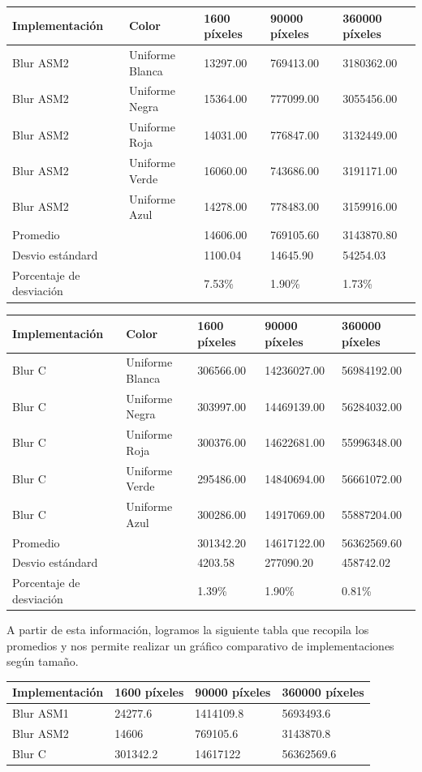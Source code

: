 \begin{tabular}{| l | l | l | l | l |}
\hline
Implementación & Color & 1600 píxeles & 90000 píxeles & 360000 píxeles\\
\hline
Blur ASM2 & Uniforme Blanca & 13297.00 & 769413.00 & 3180362.00\\ 
\hline
Blur ASM2 & Uniforme Negra & 15364.00 & 777099.00 & 3055456.00\\ 
\hline
Blur ASM2 & Uniforme Roja & 14031.00 & 776847.00 & 3132449.00\\ 
\hline
Blur ASM2 & Uniforme Verde & 16060.00 & 743686.00 & 3191171.00\\
\hline
Blur ASM2 & Uniforme Azul & 14278.00 & 778483.00 & 3159916.00\\
\hline
Promedio & &   14606.00 & 769105.60 & 3143870.80\\
\hline
Desvio estándard  &&  1100.04 & 14645.90 & 54254.03\\
\hline
Porcentaje de desviación  &&   7.53\% & 1.90\% & 1.73\%\\
\hline
\end{tabular}

\begin{tabular}{| l | l | l | l | l |}
\hline
Implementación & Color & 1600 píxeles & 90000 píxeles & 360000 píxeles\\
\hline
Blur C & Uniforme Blanca & 306566.00 & 14236027.00 & 56984192.00\\ 
\hline
Blur C & Uniforme Negra & 303997.00 & 14469139.00 & 56284032.00\\ 
\hline
Blur C & Uniforme Roja & 300376.00 & 14622681.00 & 55996348.00\\ 
\hline
Blur C & Uniforme Verde & 295486.00 & 14840694.00 & 56661072.00\\
\hline
Blur C & Uniforme Azul & 300286.00 & 14917069.00 & 55887204.00\\
\hline
Promedio & &   301342.20 & 14617122.00 & 56362569.60\\
\hline
Desvio estándard  &&  4203.58 & 277090.20 & 458742.02\\
\hline
Porcentaje de desviación  &&   1.39\% & 1.90\% & 0.81\%\\
\hline
\end{tabular}

A partir de esta información, logramos la siguiente tabla que recopila los promedios y nos permite realizar un gráfico comparativo de implementaciones según tamaño.



\begin{tabular}{| l | l | l | l|}
\hline
Implementación  & 1600 píxeles & 90000 píxeles & 360000 píxeles\\
\hline
Blur ASM1  & 24277.6 & 1414109.8 & 5693493.6\\
\hline
Blur ASM2  &  14606 & 769105.6 & 3143870.8\\
\hline
Blur C & 301342.2 & 14617122 & 56362569.6\\
\hline
\end{tabular}

